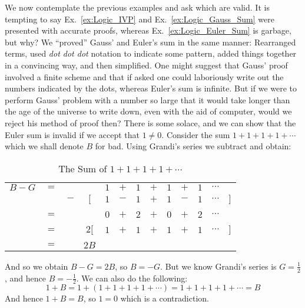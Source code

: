     We now contemplate the previous examples and ask which are valid. It is
    tempting to say Ex.~\ref{ex:Logic_IVP} and Ex.~\ref{ex:Logic_Gauss_Sum} were
    presented with accurate proofs, whereas Ex.~\ref{ex:Logic_Euler_Sum} is
    garbage, but why? We ``proved'' Gauss' and Euler's sum in the same manner:
    Rearranged terms, used \textit{dot dot dot} notation to indicate some
    pattern, added things together in a convincing way, and then simplified. One
    might suggest that Gauss' proof involved a finite scheme and that if asked
    one could laboriously write out the numbers indicated by the dots, whereas
    Euler's sum is infinite. But if we were to perform Gauss' problem with a
    number so large that it would take longer than the age of the universe to
    write down, even with the aid of computer, would we reject his method of
    proof then? There is some solace, and we can show that the Euler sum is
    invalid if we accept that $1\ne{0}$. Consider the sum $1+1+1+1+\cdots$ which
    we shall denote $B$ for bad. Using Grandi's series we subtract and obtain:
    \begin{table}[H]
        \centering
        \captionsetup{type=table}
        \begin{tabular}{ccccccccccccc}
            $B-G$&$=$&&       &$1$&$+$&$1$&$+$&$1$&$+$&$1$&$\cdots$\\
                 &&$-$&$\Big[$&$1$&$-$&$1$&$+$&$1$&$-$&$1$&$\cdots$&$\Big]$
            \\[1ex]
            \hline\\
                 &$=$&&&$0$&$+$&$2$&$+$&$0$&$+$&$2$&$\cdots$\\[1ex]
            \hline\\
            &$=$&&$2\Big[$&$1$&$+$&$1$&$+$&$1$&$+$&$1$&$\cdots$&$\Big]$
                \\[1ex]
            \hline\\
            &$=$&&$2B$
        \end{tabular}
        \caption{The Sum of $1+1+1+1+\cdots$}
    \end{table}
    And so we obtain $B-G=2B$, so $B=\minus{G}$. But we know Grandi's series is
    $G=\frac{1}{2}$, and hence $B=\minus\frac{1}{2}$. We can also do the
    following:
    \begin{equation}
        1+B=1+(1+1+1+1+\cdots)=1+1+1+1+\cdots=B
    \end{equation}
    And hence $1+B=B$, so $1=0$ which is a contradiction.
